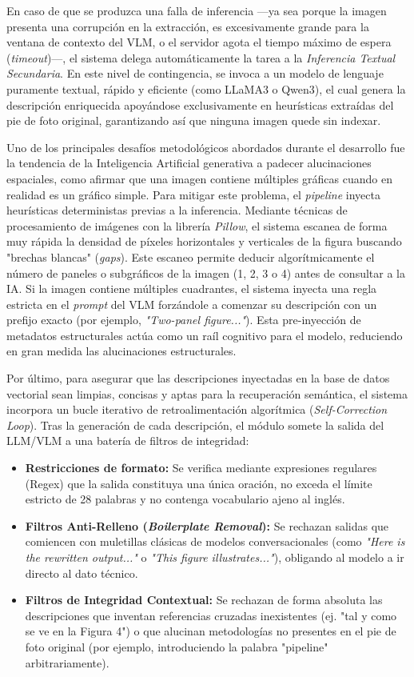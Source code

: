 \documentclass[a4paper]{report}
\begin{document}
En caso de que se produzca una falla de inferencia —ya sea porque la imagen presenta una corrupción en la extracción, es excesivamente grande para la ventana de contexto del VLM, o el servidor agota el tiempo máximo de espera (\textit{timeout})—, el sistema delega automáticamente la tarea a la \textit{Inferencia Textual Secundaria}. En este nivel de contingencia, se invoca a un modelo de lenguaje puramente textual, rápido y eficiente (como LLaMA3 o Qwen3), el cual genera la descripción enriquecida apoyándose exclusivamente en heurísticas extraídas del pie de foto original, garantizando así que ninguna imagen quede sin indexar.

Uno de los principales desafíos metodológicos abordados durante el desarrollo fue la tendencia de la Inteligencia Artificial generativa a padecer alucinaciones espaciales, como afirmar que una imagen contiene múltiples gráficas cuando en realidad es un gráfico simple. Para mitigar este problema, el \textit{pipeline} inyecta heurísticas deterministas previas a la inferencia. Mediante técnicas de procesamiento de imágenes con la librería \textit{Pillow}, el sistema escanea de forma muy rápida la densidad de píxeles horizontales y verticales de la figura buscando "brechas blancas" (\textit{gaps}). Este escaneo permite deducir algorítmicamente el número de paneles o subgráficos de la imagen (1, 2, 3 o 4) antes de consultar a la IA. Si la imagen contiene múltiples cuadrantes, el sistema inyecta una regla estricta en el \textit{prompt} del VLM forzándole a comenzar su descripción con un prefijo exacto (por ejemplo, \textit{"Two-panel figure..."}). Esta pre-inyección de metadatos estructurales actúa como un raíl cognitivo para el modelo, reduciendo en gran medida las alucinaciones estructurales.

Por último, para asegurar que las descripciones inyectadas en la base de datos vectorial sean limpias, concisas y aptas para la recuperación semántica, el sistema incorpora un bucle iterativo de retroalimentación algorítmica (\textit{Self-Correction Loop}). Tras la generación de cada descripción, el módulo somete la salida del LLM/VLM a una batería de filtros de integridad:
\begin{itemize}
    \item \textbf{Restricciones de formato:} Se verifica mediante expresiones regulares (Regex) que la salida constituya una única oración, no exceda el límite estricto de 28 palabras y no contenga vocabulario ajeno al inglés.
    \item \textbf{Filtros Anti-Relleno (\textit{Boilerplate Removal}):} Se rechazan salidas que comiencen con muletillas clásicas de modelos conversacionales (como \textit{"Here is the rewritten output..."} o \textit{"This figure illustrates..."}), obligando al modelo a ir directo al dato técnico.
    \item \textbf{Filtros de Integridad Contextual:} Se rechazan de forma absoluta las descripciones que inventan referencias cruzadas inexistentes (ej. "tal y como se ve en la Figura 4") o que alucinan metodologías no presentes en el pie de foto original (por ejemplo, introduciendo la palabra "pipeline" arbitrariamente).
\end{itemize}
\end{document}

